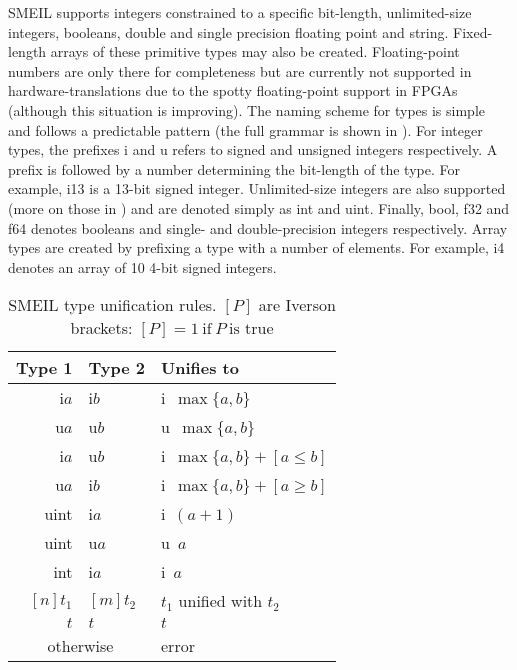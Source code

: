 SMEIL supports integers constrained to a specific bit-length, unlimited-size
integers, booleans, double and single precision floating point and
string. Fixed-length arrays of these primitive types may also be
created. Floating-point numbers are only there for completeness but are
currently not supported in hardware-translations due to the spotty
floating-point support in FPGAs (although this situation is improving). The
naming scheme for types is simple and follows a predictable pattern (the full
grammar is shown in ). For integer types, the prefixes
{\ttfamily i} and {\ttfamily u} refers to signed and unsigned integers
respectively. A prefix is followed by a number determining the bit-length of the
type. For example, {\ttfamily i13} is a 13-bit signed integer. Unlimited-size
integers are also supported (more on those in ) and are denoted
simply as {\ttfamily int} and {\ttfamily uint}. Finally, {\ttfamily bool},
{\ttfamily f32} and {\ttfamily f64} denotes booleans and single- and
double-precision integers respectively. Array types are created by prefixing a
type with a number of elements. For example, {\ttfamily [10]i4} denotes an array
of 10 4-bit signed integers.

\begin{table}
  \centering
  \begin{tabular}{rll}
    \toprule
    Type 1 & Type 2 & Unifies to \\
    \midrule
    i$a$ & i$b$ & i~$\max\{a, b\}$\\
    u$a$ & u$b$ & u~$\max\{a, b\} $\\
    i$a$ & u$b$ & i~$\max\{a, b\} + [a \leq b]$\\
    u$a$ & i$b$ & i~$\max\{a, b\} + [a \geq b]$\\
    uint & i$a$ & i~$(a + 1)$\\
    uint & u$a$ & u~$a$\\
    int & i$a$ & i~$a$\\
    $[n]t_1$ & $[m]t_2$ & $t_1$ unified with $t_2$\\
    $t$ & $t$ & $t$ \\
    \multicolumn{2}{c}{otherwise} & error\\
    \bottomrule
  \end{tabular}
  \caption{SMEIL type unification rules. $[P]$ are Iverson brackets:
    $[P] = 1~\text{if}~P~\text{is true}$}
  \label{tab:typeuni}
\end{table}

  
